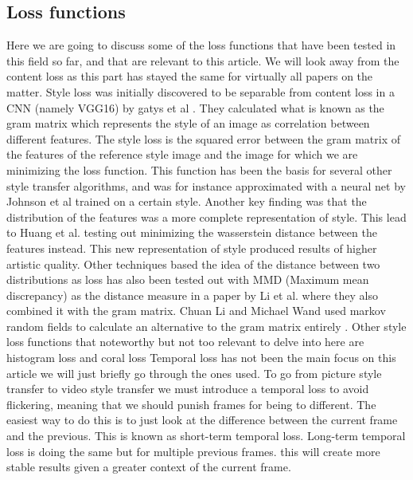\subsection{Loss functions}
Here we are going to discuss some of the loss functions that have been tested in this field so far, and that are relevant to this article. We will look away from the content loss as this part has stayed the same for virtually all papers on the matter.
\newline\newline
Style loss was initially discovered to be separable from content loss in a CNN (namely VGG16) by gatys et al \cite{Gatys:1}. They calculated what is known as the gram matrix which represents the style of an image as correlation between different features. The style loss is the squared error between the gram matrix of the features of the reference style image and the image for which we are minimizing the loss function. This function has been the basis for several other style transfer algorithms, and was for instance approximated with a neural net by Johnson et al \cite{Johnson:1} trained on a certain style.
\newline\newline
Another key finding was that the distribution of the features was a more complete representation of style. This lead to Huang et al. \cite{Huang:1} testing out minimizing the wasserstein distance between the features instead. This new representation of style produced results of higher artistic quality. Other techniques based the idea of the distance between two distributions as loss has also been tested out with MMD (Maximum mean discrepancy) as the distance measure in a paper by Li et al. \cite{Li:2} where they also combined it with the gram matrix. Chuan Li and Michael Wand used markov random fields to calculate an alternative to the gram matrix entirely \cite{Li:3}. Other style loss functions that noteworthy but not too relevant to delve into here are histogram loss \cite{Risser:1} and coral loss \cite{sun:1}
\newline\newline
Temporal loss has not been the main focus on this article we will just briefly go through the ones used. To go from picture style transfer to video style transfer we must introduce a temporal loss to avoid flickering, meaning that we should punish frames for being to different. The easiest way to do this is to just look at the difference between the current frame and the previous. This is known as short-term temporal loss. Long-term temporal loss is doing the same but for multiple previous frames. this will create more stable results given a greater context of the current frame.
